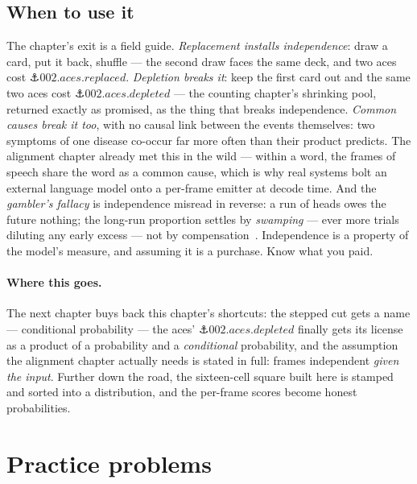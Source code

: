 \begin{narrative}
\section{When to use it}

The chapter's exit is a field guide. \emph{Replacement installs
independence}: draw a card, put it back, shuffle — the second draw
faces the same deck, and two aces cost
$\anchor{002.aces.replaced}$. \emph{Depletion breaks it}: keep the
first card out and the same two aces cost
$\anchor{002.aces.depleted}$ — the counting chapter's shrinking pool,
returned exactly as promised, as the thing that breaks independence.
\emph{Common causes break it too}, with no causal link between the
events themselves: two symptoms of one disease co-occur far more often
than their product predicts. The alignment chapter already met this in
the wild — within a word, the frames of speech share the word as a
common cause, which is why real systems bolt an external language model
onto a per-frame emitter at decode time. And the \emph{gambler's
fallacy} is independence misread in reverse: a run of heads owes the
future nothing; the long-run proportion settles by \emph{swamping} —
ever more trials diluting any early excess — not by
compensation~\cite{probability-libretexts-the-gambler-s-fallacy}.
Independence is a property of the model's measure, and assuming it is a
purchase. Know what you paid.

\paragraph{Where this goes.} The next chapter buys back this chapter's
shortcuts: the stepped cut gets a name — conditional probability — the
aces' $\anchor{002.aces.depleted}$ finally gets its license as a
product of a probability and a \emph{conditional} probability, and the
assumption the alignment chapter actually needs is stated in full:
frames independent \emph{given the input}. Further down the road, the
sixteen-cell square built here is stamped and sorted into a
distribution, and the per-frame scores become honest probabilities.
\end{narrative}

\section*{Practice problems}

